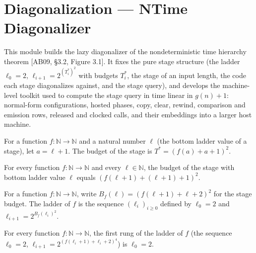 \section{Diagonalization --- NTime Diagonalizer}
This module builds the lazy diagonalizer of the nondeterministic time hierarchy theorem
[AB09, \S3.2, Figure 3.1]. It fixes the pure stage structure (the ladder $\ell_0 = 2$,
$\ell_{i+1} = 2^{(T^*_i)^2}$ with budgets $T^*_i$, the stage of an input length, the code each
stage diagonalizes against, and the stage query), and develops the machine-level toolkit used to
compute the stage query in time linear in $g(n) + 1$: normal-form configurations, hosted phases,
copy, clear, rewind, comparison and emission rows, released and clocked calls, and their
embeddings into a larger host machine.

\begin{definition}
\label{Turing.NTimeDiag.budget}
\leanok
For a function $f : \mathbb{N} \to \mathbb{N}$ and a natural number $\ell$ (the bottom ladder value
of a stage), let $a = \ell + 1$. The budget of the stage is $T^* = (f(a) + a + 1)^2$.
\end{definition}

\begin{theorem}
\label{Turing.NTimeDiag.budget_eq}
\leanok
{}
For every function $f : \mathbb{N} \to \mathbb{N}$ and every $\ell \in \mathbb{N}$, the budget of
the stage with bottom ladder value $\ell$ equals $(f(\ell + 1) + (\ell + 1) + 1)^2$.
\end{theorem}

\begin{definition}
\label{Turing.NTimeDiag.ladder}
\leanok
{}
For a function $f : \mathbb{N} \to \mathbb{N}$, write $B_f(\ell) = (f(\ell+1) + \ell + 2)^2$ for
the stage budget. The ladder of $f$ is the sequence $(\ell_i)_{i \ge 0}$ defined by $\ell_0 = 2$
and $\ell_{i+1} = 2^{B_f(\ell_i)^2}$.
\end{definition}

\begin{theorem}
\label{Turing.NTimeDiag.ladder_zero}
\leanok
{}
For every function $f : \mathbb{N} \to \mathbb{N}$, the first rung of the ladder of $f$ (the
sequence $\ell_0 = 2$, $\ell_{i+1} = 2^{(f(\ell_i+1) + \ell_i + 2)^4}$) is $\ell_0 = 2$.
\end{theorem}

